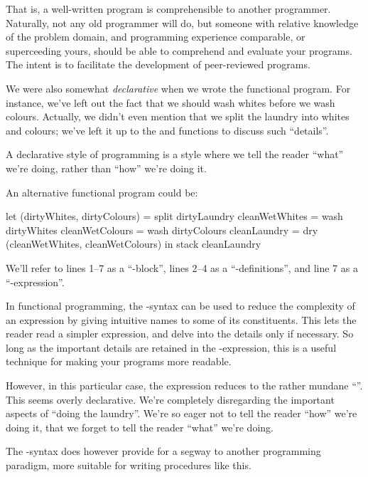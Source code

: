 That is, a well-written program is comprehensible to another programmer.
Naturally, not any old programmer will do, but someone with relative knowledge
of the problem domain, and programming experience comparable, or superceeding
yours, should be able to comprehend and evaluate your programs. The intent is
to facilitate the development of peer-reviewed programs.

We were also somewhat \emph{declarative} when we wrote the functional program.
For instance, we've left out the fact that we should wash whites before we wash
colours. Actually, we didn't even mention that we split the laundry into whites
and colours; we've left it up to the  and  functions to
discuss such ``details''.

\begin{definition}

A declarative style of programming is a style where we tell the reader ``what''
we're doing, rather than ``how'' we're doing it.

\end{definition}

An alternative functional program could be:

\begin{code}
let
  (dirtyWhites, dirtyColours) = split dirtyLaundry
  cleanWetWhites = wash dirtyWhites
  cleanWetColours = wash dirtyColours
  cleanLaundry = dry (cleanWetWhites, cleanWetColours)
in
  stack cleanLaundry
\end{code}

We'll refer to lines 1--7 as a ``-block'', lines 2--4 as a
``-definitions'', and line 7 as a ``-expression''.

In functional programming, the -syntax can be used to reduce the
complexity of an expression by giving intuitive names to some of its
constituents. This lets the reader read a simpler expression, and delve into
the details only if necessary. So long as the important details are retained in
the -expression, this is a useful technique for making your programs
more readable.

However, in this particular case, the expression reduces to the rather mundane
``''. This seems overly declarative. We're completely
disregarding the important aspects of ``doing the laundry''. We're so eager not
to tell the reader ``how'' we're doing it, that we forget to tell the reader
``what'' we're doing.

The -syntax does however provide for a segway to another programming
paradigm, more suitable for writing procedures like this.

